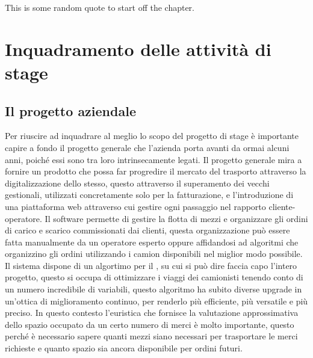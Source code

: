 \begin{savequote}[75mm]
This is some random quote to start off the chapter.
\end{savequote}

\hypertarget{(chap:inquadramento)}{}
\chapter{Inquadramento delle attività di stage}

\section{Il progetto aziendale}
Per riuscire ad inquadrare al meglio lo scopo del progetto di stage è importante capire a fondo il progetto generale che l'azienda porta avanti da ormai alcuni anni, poiché essi sono tra loro intrinsecamente legati. Il progetto generale mira a fornire un prodotto che possa far progredire il mercato del trasporto attraverso la digitalizzazione dello stesso, questo attraverso il superamento dei vecchi gestionali, utilizzati concretamente solo per la fatturazione, e l'introduzione di una piattaforma web attraverso cui gestire ogni passaggio nel rapporto cliente-operatore.
Il software permette di gestire la flotta di mezzi e organizzare gli ordini di carico e scarico commissionati dai clienti, questa organizzazione può essere fatta manualmente da un operatore esperto oppure affidandosi ad algoritmi che organizzino gli ordini utilizzando i camion disponibili nel miglior modo possibile. Il sistema dispone di un algortimo per il , su cui si può dire faccia capo l'intero progetto, questo si occupa di ottimizzare i viaggi dei camionisti tenendo conto di un numero incredibile di variabili, questo algoritmo ha subito diverse upgrade in un'ottica di miglioramento continuo, per renderlo più efficiente, più versatile e più preciso.
In questo contesto l'euristica che fornisce la valutazione approssimativa dello spazio occupato da un certo numero di merci è molto importante, questo perché è necessario sapere quanti mezzi siano necessari per trasportare le merci richieste e quanto spazio sia ancora disponibile per ordini futuri.

